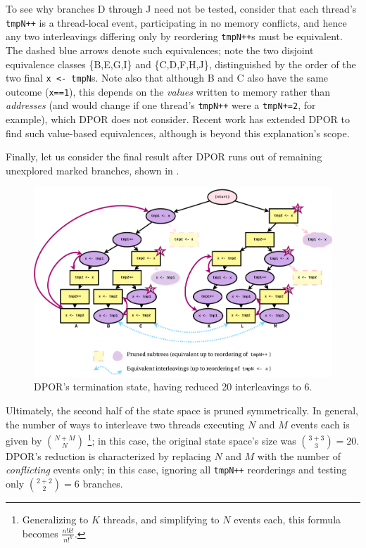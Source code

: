 To see why branches D through J need not be tested, consider that each thread's {\tt tmpN++} is a thread-local event,
participating in no memory conflicts,
and hence any two interleavings differing only by reordering {\tt tmpN++}s must be equivalent.
The dashed blue arrows denote such equivalences;
note the two disjoint equivalence classes \{B,E,G,I\} and \{C,D,F,H,J\},
distinguished by the order of the two final {\tt x~<-~tmpN}s.
Note also that
although B and C also have the same outcome ({\tt x==1}),
this depends on the {\em values} written to memory rather than {\em addresses}
(and would change if one thread's {\tt tmpN++} were a {\tt tmpN+=2}, for example),
which DPOR does not consider.
Recent work \cite{mcr} has extended DPOR to find such value-based equivalences,
although is beyond this explanation's scope.

Finally, let us consider the final result after DPOR runs out of remaining unexplored marked branches,
shown in .

\begin{figure}[h]
	\begin{center}
		\includegraphics[width=\textwidth]{dpor-example-2.pdf}
	\end{center}
	\caption{DPOR's termination state, having reduced 20 interleavings to 6.}
	\label{fig:dpor-example-2}
\end{figure}

Ultimately, the second half of the state space is pruned symmetrically.
In general, the number of ways to interleave two threads executing $N$ and $M$ events each is given by ${N+M \choose N}$%
\footnote{Generalizing to $K$ threads, and simplifying to $N$ events each,
this formula becomes $\frac{n!k!}{n!^k}$.};
in this case, the original state space's size was ${3+3 \choose 3} = 20$.
DPOR's reduction is characterized by replacing $N$ and $M$ with the number of {\em conflicting} events only;
in this case, ignoring all {\tt tmpN++} reorderings and testing only ${2+2 \choose 2} = 6$ branches.

